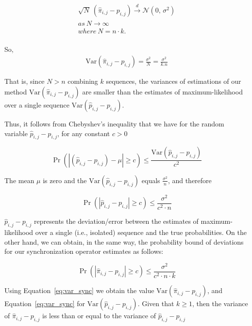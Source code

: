 \begin{equation}
\begin{aligned}
\label{eq:lim_dist2}
\sqrt{N}\ (\hat{\pi}_{i,j} - {p}_{i,j}) \xrightarrow{d} \mathcal{N}(0,\,\sigma^{2})\\
as\ N \xrightarrow{} \infty\\
where\ N = n \cdot k .\\
\end{aligned}
\end{equation}

So, 
\begin{equation}
\begin{aligned}
\label{eq:var_sync}
 \mathrm{Var} (\hat{\pi}_{i,j} - {p}_{i,j}) = \frac {\sigma^{2}}{N} =  \frac {\sigma^{2}}{k.n}
\end{aligned}
\end{equation}


That is, since $N > n$ combining $k$ sequences, the variances of estimations of our method  $\mathrm{Var} (\hat{\pi}_{i,j} - {p}_{i,j})$ are smaller than the estimates of maximum-likelihood over a single sequence $\mathrm{Var} (\hat{p}_{i,j} - {p}_{i,j})$. 
\par Thus, it follows from Chebyshev's inequality \cite{feller1968introduction} that we have for the random variable $\hat{p}_{i,j} - {p}_{i,j}$, for any constant $c > 0$  

\[ \Pr\left( |(\hat{p}_{i,j} - {p}_{i,j}) - \mu| \geq c \right) \leq
\frac{\mathrm{Var} (\hat{p}_{i,j} - {p}_{i,j})}{c^2} \]


 The mean $\mu$ is zero and the $\mathrm{Var} (\hat{p}_{i,j} - {p}_{i,j})$ equals  $\frac {\sigma^{2}}{n}$, and therefore 
 
 \[ \Pr\left( |\hat{p}_{i,j} - {p}_{i,j}| \geq c \right) \leq
 \frac{\sigma^{2}}{c^2 \cdot n} \]
 
 
$\hat{p}_{i,j} - {p}_{i,j}$  represents the deviation/error between the estimates of maximum-likelihood over a single (i.e., isolated) sequence and the true probabilities. On the other hand, we can obtain, in the same way, the probability bound of deviations for our synchronization operator estimates as follows:

\[ \Pr\left( |\hat{\pi}_{i,j} - {p}_{i,j}| \geq c \right) \leq
\frac{\sigma^{2}}{c^2 \cdot n \cdot k} \]


\par Using Equation~\ref{eq:var_sync} we obtain the value $\mathrm{Var} (\hat{\pi}_{i,j} - {p}_{i,j})$, and Equation~\ref{eq:var_sync} for $\mathrm{Var} (\hat{p}_{i,j} - {p}_{i,j})$. Given that $k \ge 1$, then  the variance of $\hat{\pi}_{i,j} - {p}_{i,j}$  is less than or equal to the variance of $\hat{p}_{i,j} - {p}_{i,j}$

